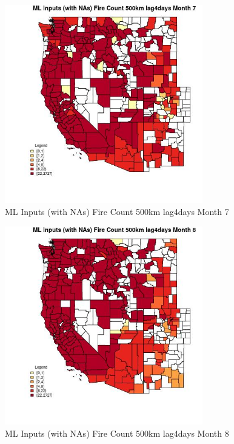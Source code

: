 \begin{figure} 
\centering  
\includegraphics[width=0.77\textwidth]{Code_Outputs/Report_ML_input_PM25_Step4_part_f_de_duplicated_aveswNAs_CountyFire_Count_500km_lag4daysmedianMonth7.jpg} 
\caption{\label{fig:Report_ML_input_PM25_Step4_part_f_de_duplicated_aveswNAsCountyFire_Count_500km_lag4daysmedianMonth7}ML Inputs (with NAs) Fire Count 500km lag4days Month 7} 
\end{figure} 
 

\begin{figure} 
\centering  
\includegraphics[width=0.77\textwidth]{Code_Outputs/Report_ML_input_PM25_Step4_part_f_de_duplicated_aveswNAs_CountyFire_Count_500km_lag4daysmedianMonth8.jpg} 
\caption{\label{fig:Report_ML_input_PM25_Step4_part_f_de_duplicated_aveswNAsCountyFire_Count_500km_lag4daysmedianMonth8}ML Inputs (with NAs) Fire Count 500km lag4days Month 8} 
\end{figure} 
 

